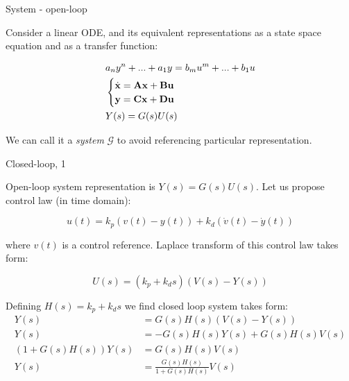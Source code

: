 \documentclass{beamer}
\begin{document}
\begin{frame}{System - open-loop}
	\begin{flushleft}
		
		Consider a linear ODE, and its equivalent representations as a state space equation and as a transfer function:
		
		\begin{align}
			&a_n y^n + ... + a_1 y = b_m u^m + ... + b_1 u
			\\
			&\begin{cases}
				\dot{\mathbf{x}} = \mathbf{A}\mathbf{x} + \mathbf{B}\mathbf{u} \\
				\mathbf{y}  = \mathbf{C}\mathbf{x} + \mathbf{D}\mathbf{u}
			\end{cases}
		\\
		&Y(s)  = G(s) U(s)
		\end{align}
		
		We can call it a \emph{system} $\mathcal{G}$ to avoid referencing particular representation.
		
	\end{flushleft}
\end{frame}



\begin{frame}{Closed-loop, 1}
	\begin{flushleft}
		
		Open-loop system representation is $Y(s)  = G(s) U(s)$. Let us propose control law (in time domain):
		
		\begin{equation}
			u(t) = k_p (v(t) - y(t)) + k_d (\dot v(t) - \dot y(t))
		\end{equation}
	
		where $v(t)$ is a control reference. Laplace transform of this control law takes form:
		
		\begin{equation}
			U(s) = (k_p + k_d s) (V(s) - Y(s))
		\end{equation}
		
		Defining $H(s) = k_p + k_d s$ we find closed loop system takes form:
		\begin{align}
			Y(s)  &= G(s) H(s) (V(s) - Y(s)) \\
			Y(s)  &= -G(s) H(s) Y(s) + G(s) H(s)V(s) \\
		    (1 + G(s) H(s)) Y(s) &=  G(s) H(s)V(s) \\
		    Y(s) &= \frac{G(s) H(s)}{1 + G(s) H(s)} V(s)
		\end{align}
		
		
	\end{flushleft}
\end{frame}
\end{document}
